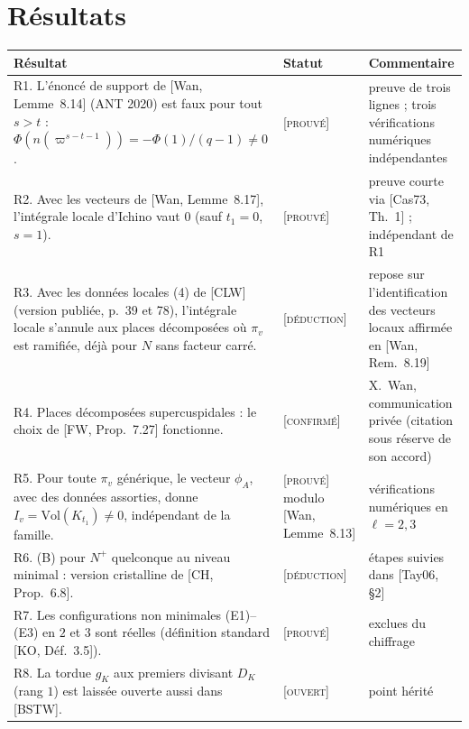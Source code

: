 \documentclass[11pt]{amsart}
\newcommand{\stat}[1]{\textsc{[#1]}}
\newcommand{\Vol}{\mathrm{Vol}}
\begin{document}
\section{Résultats}
\begin{center}\small
\begin{tabular}{p{7.4cm}p{2.3cm}p{4.2cm}}
\toprule
Résultat & Statut & Commentaire\\ \midrule
R1. L'énoncé de support de [Wan, Lemme~8.14] (ANT 2020) est faux pour tout $s>t$ : $\Phi(n(\varpi^{s-t-1}))=-\Phi(1)/(q-1)\neq0$. & \stat{prouvé} & preuve de trois lignes ; trois vérifications numériques indépendantes\\
R2. Avec les vecteurs de [Wan, Lemme~8.17], l'intégrale locale d'Ichino vaut $0$ (sauf $t_1=0$, $s=1$). & \stat{prouvé} & preuve courte via [Cas73, Th.~1] ; indépendant de R1\\
R3. Avec les données locales (4) de [CLW] (version publiée, p.~39 et 78), l'intégrale locale s'annule aux places décomposées où $\pi_v$ est ramifiée, déjà pour $N$ sans facteur carré. & \stat{déduction} & repose sur l'identification des vecteurs locaux affirmée en [Wan, Rem.~8.19]\\
R4. Places décomposées supercuspidales : le choix de [FW, Prop.~7.27] fonctionne. & \stat{confirmé} & X.~Wan, communication privée (citation sous réserve de son accord)\\
R5. Pour toute $\pi_v$ générique, le vecteur $\phi_A$, avec des données assorties, donne $I_v=\Vol(K_{t_1})\neq0$, indépendant de la famille. & \stat{prouvé} modulo [Wan, Lemme~8.13] & vérifications numériques en $\ell=2,3$\\
R6. (B) pour $N^+$ quelconque au niveau minimal : version cristalline de [CH, Prop.~6.8]. & \stat{déduction} & étapes suivies dans [Tay06, \S2]\\
R7. Les configurations non minimales (E1)--(E3) en $2$ et $3$ sont réelles (définition standard [KO, Déf.~3.5]). & \stat{prouvé} & exclues du chiffrage\\
R8. La tordue $g_K$ aux premiers divisant $D_K$ (rang $1$) est laissée ouverte aussi dans [BSTW]. & \stat{ouvert} & point hérité\\ \bottomrule
\end{tabular}
\end{center}
\end{document}
